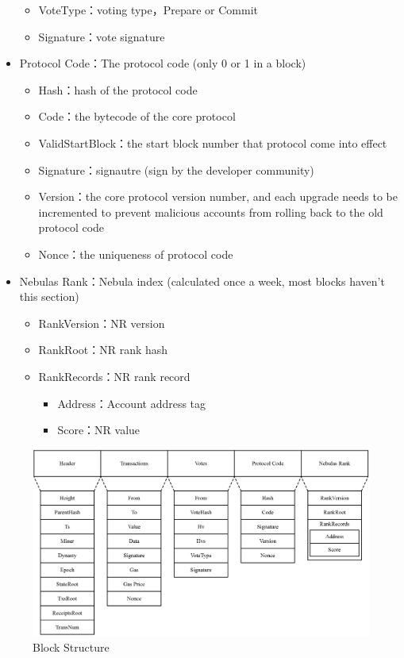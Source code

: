 \begin{itemize}
\begin{itemize}
		\item VoteType：voting type，Prepare or Commit
		\item Signature：vote signature
		\end{itemize}
	\item Protocol Code：The protocol code (only 0 or 1 in a block)
		\begin{itemize}
		\item Hash：hash of the protocol code
		\item Code：the bytecode of the core protocol
		\item ValidStartBlock：the start block number that protocol come into effect
		\item Signature：signautre (sign by the developer community)
		\item Version：the core protocol version number, and each upgrade needs to be incremented to prevent malicious accounts from rolling back to the old protocol code
		\item Nonce：the uniqueness of protocol code
		\end{itemize}
	\item Nebulas Rank：Nebula index (calculated once a week, most blocks haven't this section)
		\begin{itemize}
		\item RankVersion：NR version
		\item RankRoot：NR rank hash
		\item RankRecords：NR rank record
			\begin{itemize}
				\item Address：Account address tag
				\item Score：NR value
			\end{itemize}
		\end{itemize}
\end{itemize}

\begin{figure}[!h]
\centering
\includegraphics[width=13.8cm]{./figs/block}
\caption{Block Structure}
\label{fig:block}
\end{figure}

